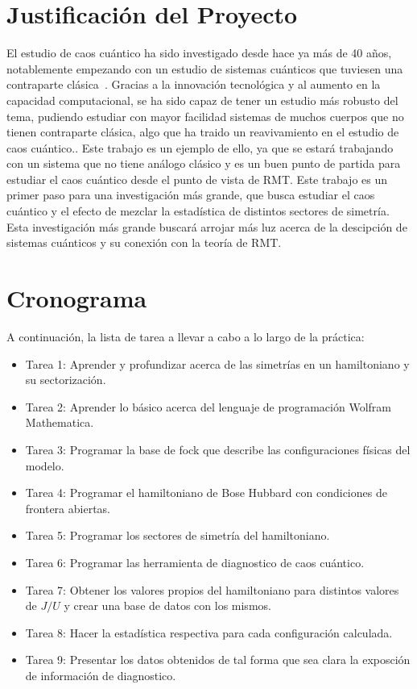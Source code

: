 \documentclass[spanish,titlepage,table]{practicas}
\begin{document}
\section{Justificación del Proyecto}
El estudio de caos cuántico ha sido investigado desde hace ya más de 40 años, notablemente empezando con un estudio de sistemas cuánticos
que tuviesen una contraparte clásica~\cite{Bohigas_1984}. Gracias a la innovación tecnológica y al aumento en la capacidad 
computacional, se ha sido capaz de tener un estudio más robusto del tema,
pudiendo estudiar con mayor facilidad sistemas de muchos cuerpos que no tienen contraparte clásica, algo que ha traido un reavivamiento en el estudio de caos cuántico.. Este trabajo es un ejemplo de ello, ya que se estará trabajando con 
un sistema que no tiene análogo clásico y es un buen punto de partida para estudiar el caos cuántico desde el punto de vista de RMT.
Este trabajo es un primer paso para una investigación más grande, que busca estudiar el caos cuántico y el efecto de mezclar la estadística 
de distintos sectores de simetría. Esta investigación más grande buscará arrojar más luz acerca de la descipción de sistemas cuánticos y su conexión con la teoría de RMT.

\section{Cronograma}
A continuación, la lista de tarea a llevar a cabo a lo largo de la práctica:
\begin{itemize}
    \item Tarea 1: Aprender y profundizar acerca de las simetrías en un hamiltoniano y su sectorización.
    \item Tarea 2: Aprender lo básico acerca del lenguaje de programación Wolfram Mathematica.
    \item Tarea 3: Programar la base de fock que describe las configuraciones físicas del modelo.
    \item Tarea 4: Programar el hamiltoniano de Bose Hubbard con condiciones de frontera abiertas.
    \item Tarea 5: Programar los sectores de simetría del hamiltoniano.
    \item Tarea 6: Programar las herramienta de diagnostico de caos cuántico. 
    \item Tarea 7: Obtener los valores propios del hamiltoniano para distintos valores de $J/U$ y crear una base de datos con los mismos.
    \item Tarea 8: Hacer la estadística respectiva para cada configuración calculada.
    \item Tarea 9: Presentar los datos obtenidos de tal forma que sea clara la exposción de información de diagnostico.
\end{itemize}



\end{document}

